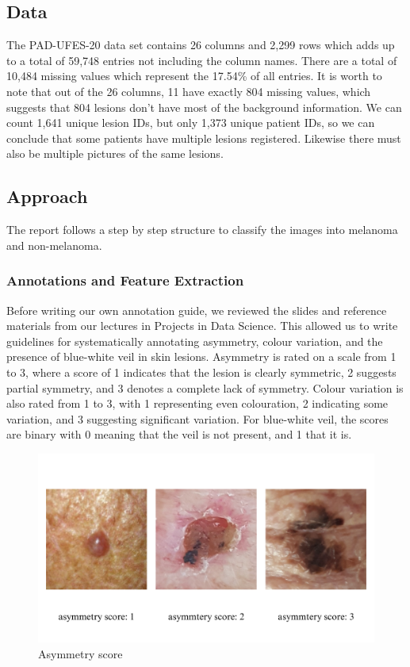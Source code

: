 \subsection{Data}
The PAD-UFES-20 data set contains 26 columns and 2,299 rows which adds up to a total of 59,748 entries not including the column names. There are a total of 10,484 missing values which represent the 17.54\% of all entries.
\newline
It is worth to note that out of the 26 columns, 11 have exactly 804 missing values, which suggests that 804 lesions don’t have most of the background information.
\newline
We can count 1,641 unique lesion IDs, but only 1,373 unique patient IDs, so we can conclude that some patients have multiple lesions registered. Likewise there must also be multiple pictures of the same lesions.

\subsection{Approach}
The report follows a step by step structure to classify the images into melanoma and non-melanoma.

\subsubsection{Annotations and Feature Extraction}
Before writing our own annotation guide, we reviewed the slides and reference materials from our lectures in Projects in Data Science. This allowed us to write guidelines for systematically annotating asymmetry, colour variation, and the presence of blue-white veil in skin lesions.
\newline
Asymmetry is rated on a scale from 1 to 3, where a score of 1 indicates that the lesion is clearly symmetric, 2 suggests partial symmetry, and 3 denotes a complete lack of symmetry.
\newline
Colour variation is also rated from 1 to 3, with 1 representing even colouration, 2 indicating some variation, and 3 suggesting significant variation.
\newline
For blue-white veil, the scores are binary with 0 meaning that the veil is not present, and 1 that it is.

\begin{figure}[H]
    \centering
    \includegraphics[width=1\linewidth]{asymmetryy.png}
    \caption{Asymmetry score}
    \label{fig:Asymmetry score}
\end{figure}

